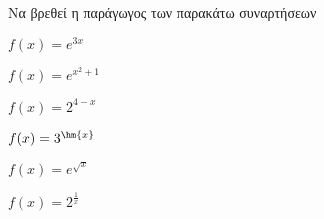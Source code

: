 Να βρεθεί η παράγωγος των παρακάτω συναρτήσεων
\begin{multicols}{2}
\begin{alist}
\item $ f(x)=e^{3x} $
\item $ f(x)=e^{x^2+1} $
\item $ f(x)=2^{4-x} $
\item $ f(x)=3^{\hm{x}} $
\item $ f(x)=e^{\sqrt{x}} $
\item $ f(x)=2^{\frac{1}{x}} $
\end{alist}
\end{multicols}
